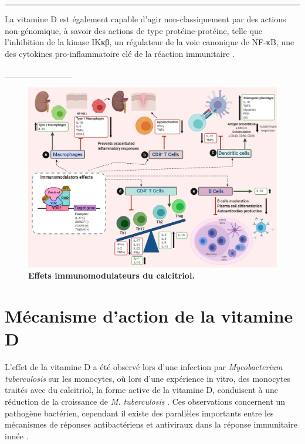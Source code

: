 \documentclass[
  a4paper,
  DIV=11,
  numbers=noendperiod,
  listof=totoc]{scrreprt}
\begin{document}
\begin{center}\rule{0.5\linewidth}{0.5pt}\end{center}

La vitamine D est également capable d'agir non-classiquement par des
actions non-génomique, à savoir des actions de type protéine-protéine,
telle que l'inhibition de la kinase IKκβ, un régulateur de la voie
canonique de NF-κB, une des cytokines pro-inflammatoire clé de la
réaction immunitaire \autocite{Hii.2016}.

\_\_\_\_\_\_\_\_\_\_\_

\begin{figure}

{\centering \includegraphics{figures/calcitriol-immunomodulatory.jpg}

}

\caption[\textbf{Effets immunomodulateurs du
calcitriol.}]{\label{fig-immunomod}\textbf{Effets immunomodulateurs du
calcitriol.} \textcite{Meza-Meza.2022}}

\end{figure}

\hypertarget{muxe9canisme-daction-de-la-vitamine-d}{%
\section{Mécanisme d'action de la vitamine
D}\label{muxe9canisme-daction-de-la-vitamine-d}}

L'effet de la vitamine D a été observé lors d'une infection par
\emph{Mycobacterium tuberculosis} sur les monocytes, où lors d'une
expérience in vitro, des monocytes traités avec du calcitriol, la forme
active de la vitamine D, conduisent à une réduction de la croissance de
\emph{M. tuberculosis} \autocite{Hewison.2011}. Ces observations
concernent un pathogène bactérien, cependant il existe des parallèles
importants entre les mécanismes de réponses antibactériens et antiviraux
dans la réponse immunitaire innée \autocite{White.2022}.
\end{document}
